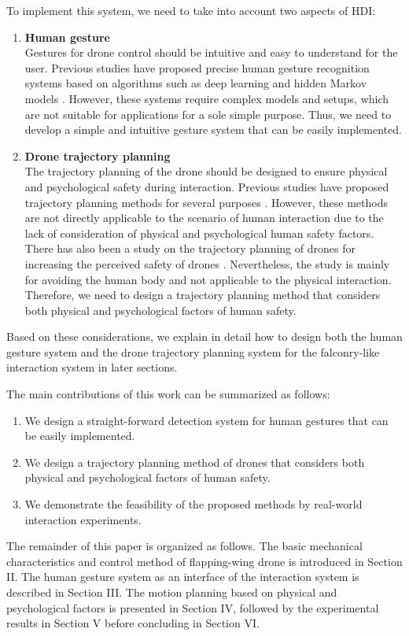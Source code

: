 To implement this system, we need to take into account two aspects of HDI:
\begin{enumerate}
    \item \textbf{Human gesture}\\
    Gestures for drone control should be intuitive and easy to understand for the user.
    Previous studies have proposed precise human gesture recognition systems based on algorithms such as deep learning \cite{guo2021hand-gesture-recognition} and hidden Markov models \cite{Wilson1999parametric-HMM}.
    However, these systems require complex models and setups, which are not suitable for applications for a sole simple purpose.
    Thus, we need to develop a simple and intuitive gesture system that can be easily implemented.
    \item \textbf{Drone trajectory planning}\\
    The trajectory planning of the drone should be designed to ensure physical and psychological safety during interaction.
    Previous studies have proposed trajectory planning methods for several purposes \cite{sandino2021object-detection-uncertainty, rezaee2024drones-collision-avoidance}.
    However, these methods are not directly applicable to the scenario of human interaction due to the lack of consideration of physical and psychological human safety factors.
    There has also been a study on the trajectory planning of drones for increasing the perceived safety of drones \cite{van2023perceived-safety}.
    Nevertheless, the study is mainly for avoiding the human body and not applicable to the physical interaction.
    Therefore, we need to design a trajectory planning method that considers both physical and psychological factors of human safety.
\end{enumerate}
Based on these considerations, we explain in detail how to design both the human gesture system and the drone trajectory planning system for the falconry-like interaction system in later sections.

The main contributions of this work can be summarized as
follows:
\begin{enumerate}
    \item We design a straight-forward detection system for human gestures that can be easily implemented.
    \item We design a trajectory planning method of drones that considers both physical and psychological factors of human safety.
    \item We demonstrate the feasibility of the proposed methods by real-world interaction experiments.
\end{enumerate}

The remainder of this paper is organized as follows. 
The basic mechanical characteristics and control method of flapping-wing drone is introduced in Section II. 
The human gesture system as an interface of the interaction system is described in Section III.
The motion planning based on physical and psychological factors is presented in Section IV,
followed by the experimental results in Section V before concluding in Section VI.